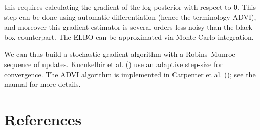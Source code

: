 \documentclass[
  11pt,
  letterpaper,
]{scrbook}
\theoremstyle{definition}
\theoremstyle{definition}
\theoremstyle{definition}
\theoremstyle{plain}
\theoremstyle{plain}
\theoremstyle{plain}
\theoremstyle{remark}
\begin{document}
this requires calculating the gradient of the log posterior with respect
to \(\boldsymbol{\theta}.\) This step can be done using automatic
differentiation (hence the terminology ADVI), and moreover this gradient
estimator is several orders less noisy than the black-box counterpart.
The ELBO can be approximated via Monte Carlo integration.

We can thus build a stochastic gradient algorithm with a Robins--Munroe
sequence of updates. Kucukelbir et al.
() use an adaptive step-size for
convergence. The ADVI algorithm is implemented in Carpenter et al.
(); see
\href{https://mc-stan.org/docs/reference-manual/variational.html}{the
manual} for more details.


\chapter{References}\label{references}
\end{document}
